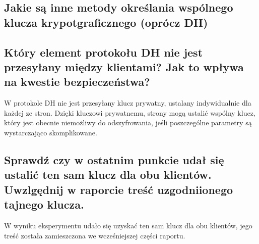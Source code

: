 \documentclass{article}
\begin{document}
\subsection{Jakie są inne metody określania wspólnego klucza krypotgraficznego (oprócz DH)}
\subsection{Który element protokołu DH nie jest przesyłany między klientami? Jak to wpływa na kwestie bezpieczeństwa?}
W protokole DH nie jest przesyłany klucz prywatny, ustalany indywidualnie dla każdej ze stron. Dzięki kluczowi prywatnemu, strony mogą ustalić wspólny klucz, który jest obecnie niemożliwy do odszyfrowania,
jeśli poszczególne parametry są wystarczająco skomplikowane.
\subsection{Sprawdź czy w ostatnim punkcie udał się ustalić ten sam klucz dla obu klientów. Uwzlgędnij w raporcie treść uzgodniionego tajnego klucza.}
W wyniku eksperymentu udało się uzyskać ten sam klucz dla obu klientów, jego treść została zamieszczona we wcześniejszej części raportu.
\end{document}
